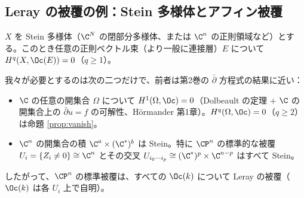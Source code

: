 \subsection{Leray の被覆の例：Stein 多様体とアフィン被覆}
\begin{thm}\label{thm:Stein}\tC
$X$ を Stein 多様体（$\C^N$ の閉部分多様体、または $\C^n$ の正則領域など）とする。このとき任意の正則ベクトル束（より一般に連接層）$E$ について $H^q(X,\Oc(E))=0$（$q\ge1$）。
\end{thm}
我々が必要とするのは次の二つだけで、前者は第2巻の $\bar\partial$ 方程式の結果に近い：
\begin{itemize}
\item $\C$ の任意の開集合 $\Omega$ について $H^1(\Omega,\Oc)=0$（Dolbeault の定理 $+$ $\C$ の開集合上の $\bar\partial u=f$ の可解性、Hörmander 第1章）。$H^q(\Omega,\Oc)=0$（$q\ge2$）は命題 \ref{prop:vanish}。
\item $\C^n$ の開集合の積 $\C^{a}\times(\C^*)^b$ は Stein。特に $\CP^n$ の標準的な被覆 $U_i=\{Z_i\ne0\}\cong\C^n$ とその交叉 $U_{i_0\cdots i_p}\cong(\C^*)^p\times\C^{n-p}$ はすべて Stein。
\end{itemize}
したがって、$\CP^n$ の標準被覆は、すべての $\Oc(k)$ について Leray の被覆（$\Oc(k)$ は各 $U_i$ 上で自明）。

